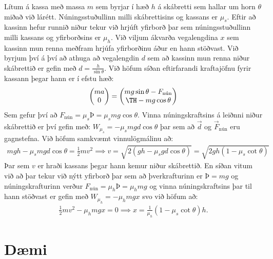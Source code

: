 \ifdefined \wholebook \else\documentclass[oneside]{book}\usepackage{EdlBook}\graphicspath{{figures/}}
\begin{document}
\begin{minipage}{\linewidth}
Lítum á kassa með massa $m$ sem byrjar í hæð $h$ á skábretti sem hallar um horn $\theta$ miðað við lárétt. Núningsstuðullinn milli skábrettisins og kassans er $\mu_s$. Eftir að kassinn hefur runnið niður tekur við hrjúft yfirborð þar sem núningsstuðullinn milli kassans og yfirborðsins er $\mu_h$. Við viljum ákvarða vegalengdina $x$ sem kassinn mun renna meðfram hrjúfa yfirborðinu áður en hann stöðvast. Við byrjum því á því að athuga að vegalengdin $d$ sem að kassinn mun renna niður skábrettið er gefin með $d = \frac{h}{\sin\theta}$. Við höfum síðan eftirfarandi kraftajöfnu fyrir kassann þegar hann er í efstu hæð:
\begin{align*}
    \mqty(ma \\ 0) = \mqty(mg\sin\theta - F_{\text{nún}} \\ Þ - mg\cos\theta)
\end{align*}
Sem gefur því að $F_{\text{nún}} = \mu_s Þ = \mu_s mg\cos\theta$. Vinna núningskraftsins á leiðnni niður skábrettið er því gefin með: $W_{\mu_s} = -\mu_s mgd\cos\theta$ þar sem að $\vec{d}$ og $\vec{F}_{\text{nún}}$ eru gagnstefna. Við höfum samkvæmt vinnulögmálinu að:
\begin{align*}
    mgh - \mu_s mgd\cos\theta = \frac{1}{2}mv^2 \implies v = \sqrt{2\left(gh - \mu_s gd \cos\theta \right)} = \sqrt{2gh\left(1 - \mu_s \cot\theta \right)}
\end{align*}
Þar sem $v$ er hraði kassans þegar hann kemur niður skábrettið. En síðan vitum við að þar tekur við nýtt yfirborð þar sem að þverkrafturinn er $Þ = mg$ og núningskrafturinn verður $F_{\text{nún}} = \mu_h Þ = \mu_h mg$ og vinna núningskraftsins þar til hann stöðvast er gefin með $W_{\mu_h} = -\mu_h mgx$ svo við höfum að:
\begin{align*}
    \frac{1}{2}mv^2 - \mu_h mgx = 0 \implies x = \frac{1}{\mu_h}\left(1- \mu_s \cot\theta \right)h.
\end{align*}


\end{minipage}






\newpage


\section{Dæmi}
\end{document}
